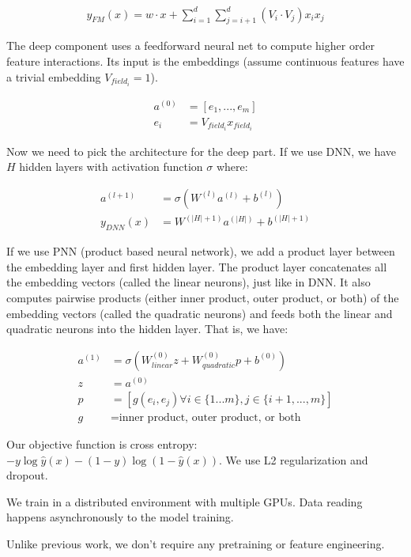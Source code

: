 \documentclass[a4paper]{article}
\begin{document}
\begin{align}
  y_{FM}(x) = w \cdot x + \sum_{i=1}^{d}{\sum_{j=i+1}^{d}{(V_i \cdot V_j)x_i x_j}}
\end{align}

The deep component uses a feedforward neural net to compute higher order
feature interactions. Its input is the embeddings (assume continuous
features have a trivial embedding $V_{field_i} = 1$).

\begin{align}
  a^{(0)} &= [e_1, ..., e_m] \\
  e_i &= V_{field_i} x_{field_i}
\end{align}

Now we need to pick the architecture for the deep part. If we use DNN, we
have $H$ hidden layers with activation function $\sigma$ where:

\begin{align}
  a^{(l+1)} &= \sigma(W^{(l)} a^{(l)} + b^{(l)}) \\
  y_{DNN}(x) &= W^{(|H|+1)} a^{(|H|)} + b^{(|H| + 1)}
\end{align}

If we use PNN (product based neural network), we add a product layer between
the embedding layer and first hidden layer. The product layer concatenates
all the embedding vectors (called the linear neurons), just like in DNN. It also
computes pairwise products (either inner product, outer product, or both)
of the embedding vectors  (called the quadratic neurons) and feeds both the
linear and quadratic neurons into the hidden layer. That is, we have:

\begin{align}
  a^{(1)} &= \sigma(W^{(0)}_{linear} z + W^{(0)}_{quadratic} p + b^{(0)}) \\
  z &= a^{(0)} \\
  p &= [g(e_i, e_j) \forall i \in \{1...m\}, j \in \{i + 1, ..., m\}] \\
  g &= \textrm{inner product, outer product, or both}
\end{align}

Our objective function is cross entropy: $-y \log{\hat{y}(x)} -
(1 - y)\log{(1 - \hat{y}(x))}$. We use L2 regularization and dropout.

We train in a distributed environment with multiple GPUs. Data reading happens
asynchronously to the model training.

Unlike previous work, we don't require any pretraining or feature engineering.
\end{document}
